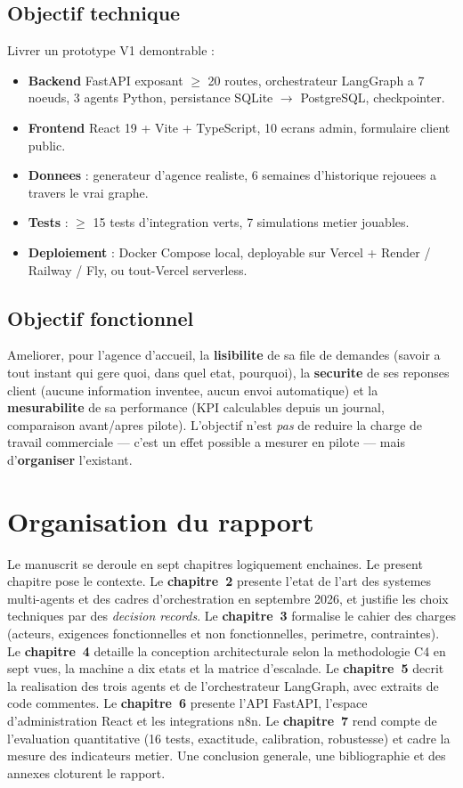 \documentclass[12pt,a4paper,openany]{report}
\begin{document}
\subsection{Objectif technique}
Livrer un prototype V1 demontrable :
\begin{itemize}[leftmargin=1.5cm]
    \item \textbf{Backend} FastAPI exposant $\geq$ 20 routes, orchestrateur LangGraph a 7 noeuds, 3 agents Python, persistance SQLite $\rightarrow$ PostgreSQL, checkpointer.
    \item \textbf{Frontend} React 19 + Vite + TypeScript, 10 ecrans admin, formulaire client public.
    \item \textbf{Donnees} : generateur d'agence realiste, 6 semaines d'historique rejouees a travers le vrai graphe.
    \item \textbf{Tests} : $\geq$ 15 tests d'integration verts, 7 simulations metier jouables.
    \item \textbf{Deploiement} : Docker Compose local, deployable sur Vercel + Render / Railway / Fly, ou tout-Vercel serverless.
\end{itemize}

\subsection{Objectif fonctionnel}
Ameliorer, pour l'agence d'accueil, la \textbf{lisibilite} de sa file de demandes (savoir a tout instant qui gere quoi, dans quel etat, pourquoi), la \textbf{securite} de ses reponses client (aucune information inventee, aucun envoi automatique) et la \textbf{mesurabilite} de sa performance (KPI calculables depuis un journal, comparaison avant/apres pilote). L'objectif n'est \emph{pas} de reduire la charge de travail commerciale --- c'est un effet possible a mesurer en pilote --- mais d'\textbf{organiser} l'existant.

\section{Organisation du rapport}

Le manuscrit se deroule en sept chapitres logiquement enchaines. Le present chapitre pose le contexte. Le \textbf{chapitre~2} presente l'etat de l'art des systemes multi-agents et des cadres d'orchestration en septembre 2026, et justifie les choix techniques par des \emph{decision records}. Le \textbf{chapitre~3} formalise le cahier des charges (acteurs, exigences fonctionnelles et non fonctionnelles, perimetre, contraintes). Le \textbf{chapitre~4} detaille la conception architecturale selon la methodologie C4 en sept vues, la machine a dix etats et la matrice d'escalade. Le \textbf{chapitre~5} decrit la realisation des trois agents et de l'orchestrateur LangGraph, avec extraits de code commentes. Le \textbf{chapitre~6} presente l'API FastAPI, l'espace d'administration React et les integrations n8n. Le \textbf{chapitre~7} rend compte de l'evaluation quantitative (16 tests, exactitude, calibration, robustesse) et cadre la mesure des indicateurs metier. Une conclusion generale, une bibliographie et des annexes cloturent le rapport.
\end{document}
